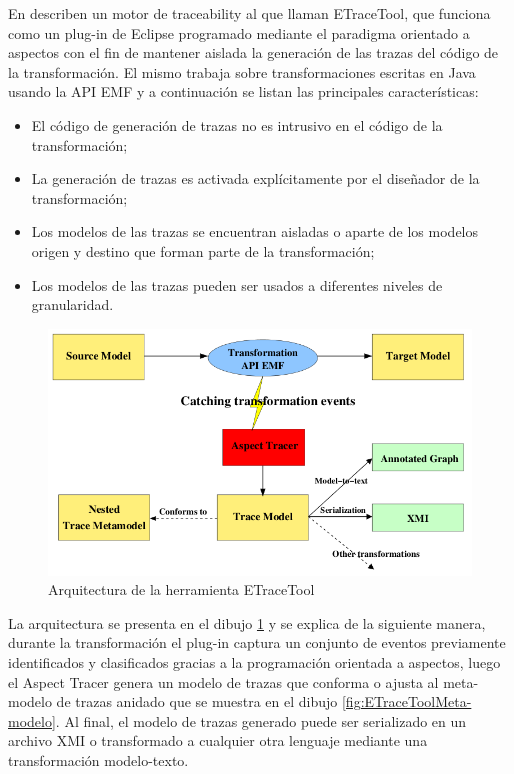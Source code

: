 \documentclass[a4paper,12pt,oneside]{book}
\begin{document}
En \cite{AmarLeblancCoulette} describen un motor de traceability al que llaman ETraceTool, que funciona como un plug-in de Eclipse programado mediante el paradigma orientado a aspectos con el fin de mantener aislada la generación de las trazas del código de la transformación. El mismo trabaja sobre transformaciones escritas en Java usando la API EMF \cite{EMF} y a continuación se listan las principales características:

\begin{itemize}
\item     El código de generación de trazas no es intrusivo en el código de la transformación;
\item    La generación de trazas es activada explícitamente por el diseñador de la transformación;
\item    Los modelos de las trazas se encuentran aisladas o aparte de los modelos origen y destino que forman parte de la transformación;
\item    Los modelos de las trazas pueden ser usados a diferentes niveles de granularidad.
\end{itemize}

\begin{figure}[hbtp]
\centering
\includegraphics[scale=0.5]{./img/ETraceTool_Arquitectura}
\caption{Arquitectura de la herramienta ETraceTool}
\label{fig:ArqETraceTool}
\end{figure}

La arquitectura se presenta en el dibujo \ref{fig:ArqETraceTool} y se explica de la siguiente manera, durante la transformación el plug-in captura un conjunto de eventos previamente identificados y clasificados gracias a la programación orientada a aspectos, luego el Aspect Tracer genera un modelo de trazas que conforma o ajusta al meta-modelo de trazas anidado que se muestra en el dibujo \ref{fig:ETraceToolMeta-modelo}. Al final, el modelo de trazas generado puede ser serializado en un archivo XMI o transformado a cualquier otra lenguaje mediante una transformación modelo-texto.
\end{document}
